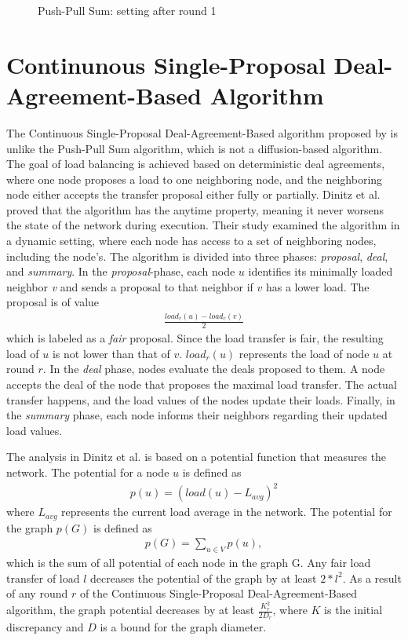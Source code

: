 \begin{figure}
    \centering
    \scalebox{0.75}{}
    \caption{Push-Pull Sum: setting after round 1}
    \label{fig:examplePPSResult}
\end{figure}

\section{Continunous Single-Proposal Deal-Agreement-Based Algorithm}\label{sec:singleproposalDAB}
The Continuous Single-Proposal Deal-Agreement-Based algorithm proposed by \cite{Dinitz2023DAB} is unlike the Push-Pull Sum algorithm, which is not a diffusion-based algorithm. The goal of load balancing is achieved based on deterministic deal agreements, where one node proposes a load to one neighboring node, and the neighboring node either accepts the transfer proposal either fully or partially. Dinitz et al. proved that the algorithm has the anytime property, meaning it never worsens the state of the network during execution. Their study examined the algorithm in a dynamic setting, where each node has access to a set of neighboring nodes, including the node's. The algorithm is divided into three phases: \textit{proposal}, \textit{deal}, and \textit{summary}. In the \textit{proposal}-phase, each node $u$ identifies its minimally loaded neighbor \textit{v} and sends a proposal to that neighbor if $v$ has a lower load. The proposal is of value 
\begin{align}
    \frac{load_{r}(u)-load_{r}(v)}{2}    
\end{align}
which is labeled as a \textit{fair} proposal. Since the load transfer is fair, the resulting load of $u$ is not lower than that of $v$. $load_{r}(u)$ represents the load of node $u$ at round $r$. In the \textit{deal} phase, nodes evaluate the deals proposed to them. A node accepts the deal of the node that proposes the maximal load transfer. The actual transfer happens, and the load values of the nodes update their loads. Finally, in the \textit{summary} phase, each node informs their neighbors regarding their updated load values. \cite{Dinitz2023DAB}



The analysis in Dinitz et al.\cite{Dinitz2023DAB} is based on a potential function that measures the network. The potential for a node $u$ is defined as 
\begin{align}
    p(u) = (load(u)-L_{avg})^{2}    
\end{align}
where $L_{avg}$ represents the current load average in the network. The potential for the graph $p(G)$ is defined as 
\begin{align}
    p(G)=\sum_{u\in V}{p(u)},   
\end{align}
which is the sum of all potential of each node in the graph G. Any fair load transfer of load $l$ decreases the potential of the graph by at least $2*l^{2}$. As a result of any round $r$ of the Continuous Single-Proposal Deal-Agreement-Based algorithm, the graph potential decreases by at least $\frac{K^{2}_r}{2D_r}$, where $K$ is the initial discrepancy and $D$ is a bound for the graph diameter. \cite{Dinitz2023DAB}

